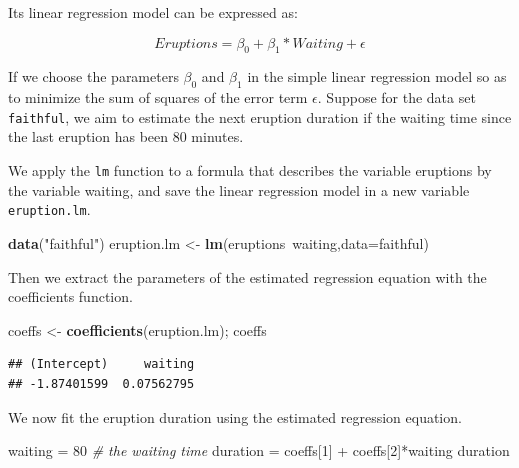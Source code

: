 \documentclass[]{article}
\newenvironment{Shaded}{\begin{snugshade}}{\end{snugshade}}
\newcommand{\KeywordTok}[1]{\textcolor[rgb]{0.13,0.29,0.53}{\textbf{{#1}}}}
\newcommand{\DataTypeTok}[1]{\textcolor[rgb]{0.13,0.29,0.53}{{#1}}}
\newcommand{\DecValTok}[1]{\textcolor[rgb]{0.00,0.00,0.81}{{#1}}}
\newcommand{\StringTok}[1]{\textcolor[rgb]{0.31,0.60,0.02}{{#1}}}
\newcommand{\CommentTok}[1]{\textcolor[rgb]{0.56,0.35,0.01}{\textit{{#1}}}}
\newcommand{\NormalTok}[1]{{#1}}
\numberwithin{equation}{section}
\begin{document}
Its linear regression model can be expressed as:

\[
Eruptions = \beta_0 + \beta_1*Waiting + \epsilon
\]

If we choose the parameters \(\beta_0\) and \(\beta_1\) in the simple
linear regression model so as to minimize the sum of squares of the
error term \(\epsilon\). Suppose for the data set \texttt{faithful}, we
aim to estimate the next eruption duration if the waiting time since the
last eruption has been 80 minutes.

We apply the \texttt{lm} function to a formula that describes the
variable eruptions by the variable waiting, and save the linear
regression model in a new variable \texttt{eruption.lm}.

\begin{Shaded}
\begin{Highlighting}[]
\KeywordTok{data}\NormalTok{(}\StringTok{"faithful"}\NormalTok{)}
\NormalTok{eruption.lm <-}\StringTok{ }\KeywordTok{lm}\NormalTok{(eruptions~waiting,}\DataTypeTok{data=}\NormalTok{faithful)}
\end{Highlighting}
\end{Shaded}

Then we extract the parameters of the estimated regression equation with
the coefficients function.

\begin{Shaded}
\begin{Highlighting}[]
\NormalTok{coeffs <-}\StringTok{ }\KeywordTok{coefficients}\NormalTok{(eruption.lm); coeffs }
\end{Highlighting}
\end{Shaded}

\begin{verbatim}
## (Intercept)     waiting 
## -1.87401599  0.07562795
\end{verbatim}

We now fit the eruption duration using the estimated regression
equation.

\begin{Shaded}
\begin{Highlighting}[]
\NormalTok{waiting =}\StringTok{ }\DecValTok{80}           \CommentTok{# the waiting time }
\NormalTok{duration =}\StringTok{ }\NormalTok{coeffs[}\DecValTok{1}\NormalTok{] +}\StringTok{ }\NormalTok{coeffs[}\DecValTok{2}\NormalTok{]*waiting }
\NormalTok{duration }
\end{Highlighting}
\end{Shaded}
\end{document}

